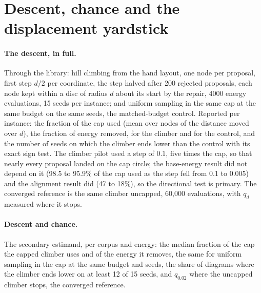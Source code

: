 \documentclass[a4paper,UKenglish]{gd-lipics-v3}
\begin{document}


\section{Descent, chance and the displacement yardstick}\label{app:descent}

\paragraph{The descent, in full.} Through the library: hill climbing from the hand layout,
one node per proposal, first step $d/2$ per coordinate, the step halved after 200 rejected
proposals, each node kept within a disc of radius $d$ about its start by the repair, 4000
energy evaluations, 15 seeds per instance; and uniform sampling in the same cap at the same
budget on the same seeds, the matched-budget control. Reported per instance: the fraction
of the cap used (mean over nodes of the distance moved over $d$), the fraction of energy
removed, for the climber and for the control, and the number of seeds on which the climber
ends lower than the control with its exact sign test. The climber pilot used a step of
$0.1$, five times the cap, so that nearly every proposal landed on the cap circle; the base-energy result did not depend on it (98.5 to 95.9\% of the cap used as the step fell from 0.1 to 0.005) and the alignment result did (47 to 18\%), so the directional test is primary. The converged reference is the same climber uncapped, 60{,}000 evaluations, with $q_d$ measured where it stops.

\paragraph{Descent and chance.} The secondary estimand, per corpus and energy: the median
fraction of the cap the capped climber uses and of the energy it removes, the same for
uniform sampling in the cap at the same budget and seeds, the share of diagrams where the
climber ends lower on at least 12 of 15 seeds, and $q_{0.02}$ where the uncapped climber
stops, the converged reference.
\end{document}
